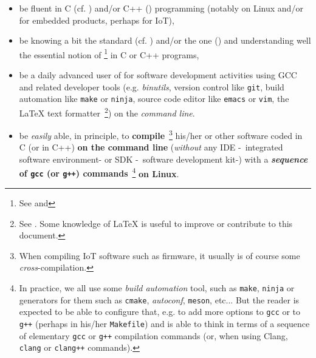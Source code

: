\begin{itemize}

  \item be fluent in C (cf. \cite{Kernighan:1988:CPL}) and/or C++
    (\cite{Stroustrup:2014:CplusPlus}) programming (notably on Linux
    and/or for embedded products, perhaps for IoT),

  \item be knowing a bit the  standard
    (cf. \cite{C11:std,Memarian:2016:PLDI}) and/or the
     one (\cite{CplusPlus11:std}) and
    understanding well the essential notion of  \footnote{See
      and } in C or C++
    programs,

  \item be a daily advanced user of  for software
    development activities 
     using GCC and related developer tools
    (e.g. \textit{binutils}, version control like \texttt{git}, build
    automation like \texttt{make} or \texttt{ninja}, source code
    editor like \texttt{emacs} or \texttt{vim}, the {\LaTeX} text
    formatter~\footnote{See
      . Some knowledge of
            {\LaTeX} is useful to improve or contribute to this
            document.}) on the \emph{command line}.
    
    \item be \emph{easily} able, in principle, to
      \textbf{compile}~\footnote{When compiling IoT software such as
        firmware, it usually is of course some
        \emph{cross}-compilation.}  his/her or other software coded in
      C (or in C++) \textbf{on the command line} (\emph{without} any
      IDE
      -~integrated software
      environment- or  SDK
      -~software development kit-)
      with a \textbf{\emph{sequence} of \texttt{gcc} (or \texttt{g++})
        commands}~\footnote{In practice, we all use some \emph{build
          automation} tool, such as \texttt{make}, \texttt{ninja} or
        generators for them such as \texttt{cmake}, \emph{autoconf},
        \texttt{meson}, etc... But the reader is expected to be able
        to configure that, e.g. to add more options to \texttt{gcc} or
        to \texttt{g++} (perhaps in his/her \texttt{Makefile}) and is
        able to think in terms of a sequence of elementary
        \texttt{gcc} or \texttt{g++} compilation commands (or, when
        using Clang, \texttt{clang} or \texttt{clang++} commands).}
      \textbf{on Linux}.




\end{itemize}
